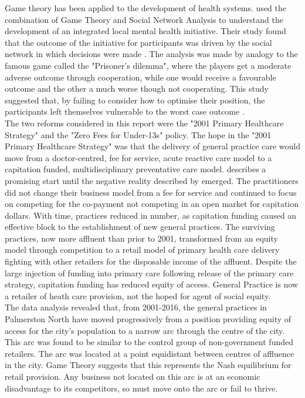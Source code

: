 \documentclass[11pt,a4paper]{article}
\begin{document}
Game theory has been applied to the development of health systems. \citet{dobson2004sustainable} used the combination of Game Theory and Social Network Analysis to understand the development of an integrated local mental health initiative. Their study found that the outcome of the initiative for participants was driven by the social network in which decisions were made \citep{dobson2004sustainable}. The analysis was made by analogy to the famous game called the "Prisoner's dilemma", where the players get a moderate adverse outcome through cooperation, while one would receive a favourable outcome and the other a much worse though not cooperating. This study suggested that, by failing to consider how to optimise their position, the participants left themselves vulnerable to the worst case outcome \citep{dobson2004sustainable}. \\


The two reforms considered in this report were the "2001 Primary Healthcare Strategy" \citep{king2001primary} and the "Zero Fees for Under-13s" policy\citep{frizelle2014health}. The hope in the "2001 Primary Healthcare Strategy" \citep{king2001primary} was that the delivery of general practice care would move from a doctor-centred, fee for service, acute reactive care model to a capitation funded, multidisciplinary preventative care model. \citet{hefford2005reducing} describes a promising start until the negative reality described by \citet{howell2005restructuring} emerged. The practitioners did not change their business model from a fee for service and continued to focus on competing for the co-payment not competing in an open market for capitation dollars. With time, practices reduced in number, as capitation funding caused an effective block to the establishment of new general practices. The surviving practices, now more affluent than prior to 2001, transformed from an equity model through competition to a retail model of primary health care delivery fighting with other retailers for the disposable income of the affluent. Despite the large injection of funding into primary care following release of the primary care strategy, capitation funding has reduced equity of access. General Practice is now a retailer of heath care provision, not the hoped for agent of social equity.\\


The data analysis revealed that, from 2001-2016, the general practices in Palmerston North have moved progressively  from a position providing equity of access for the city's population to a narrow arc through the centre of the city. This arc was found to be similar to the control group of non-government funded retailers. The arc was located at a point equidistant between centres of affluence in the city. Game Theory suggests that this represents the Nash equilibrium for retail provision. Any business not located on this arc is at an economic disadvantage to its competitors, so must move onto the arc or fail to thrive.\\
\end{document}
